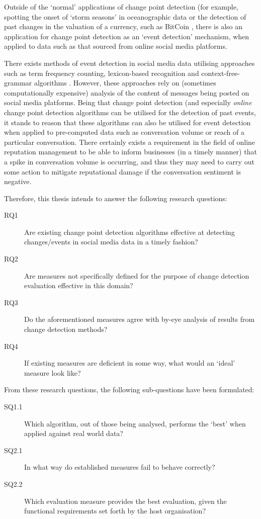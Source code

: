 \documentclass{uvamscse}	%
\begin{document}
Outside of the `normal' applications of change point detection (for example, spotting the onset of `storm seasons' in oceanographic data \cite{Killick2011} or the detection of past changes in the valuation of a currency, such as BitCoin \cite{Buntain2014}, there is also an application for change point detection as an `event detection' mechanism, when applied to data such as that sourced from online social media platforms.

There exists methods of event detection in social media data utilising approaches such as term frequency counting, lexicon-based recognition and context-free-grammar algorithms . However, these approaches rely on (sometimes computationally expensive) analysis of the content of messages being posted on social media platforms. Being that change point detection (and especially \emph{online} change point detection algorithms can be utilised for the detection of past events, it stands to reason that these algorithms can also be utilised for event detection when applied to pre-computed data such as conversation volume or reach of a particular conversation. There certainly exists a requirement in the field of online reputation management to be able to inform businesses (in a timely manner) that a spike in conversation volume is occurring, and thus they may need to carry out some action to mitigate reputational damage if the conversation sentiment is negative.

Therefore, this thesis intends to answer the following research questions:

\begin{description}
	\item[RQ1] Are existing change point detection algorithms effective at detecting changes/events in social media data in a timely fashion?
	\item[RQ2] Are measures not specifically defined for the purpose of change detection evaluation effective in this domain?
	\item[RQ3] Do the aforementioned measures agree with by-eye analysis of results from change detection methods?
	\item[RQ4] If existing measures are deficient in some way, what would an `ideal' measure look like?
\end{description}

From these research questions, the following sub-questions have been formulated:

\begin{description}
    \item[SQ1.1] Which algorithm, out of those being analysed, performs the `best' when applied against real world data?
    \item[SQ2.1] In what way do established measures fail to behave correctly?
    \item[SQ2.2] Which evaluation measure provides the best evaluation, given the functional requirements set forth by the host organisation?
\end{description}
\end{document}
